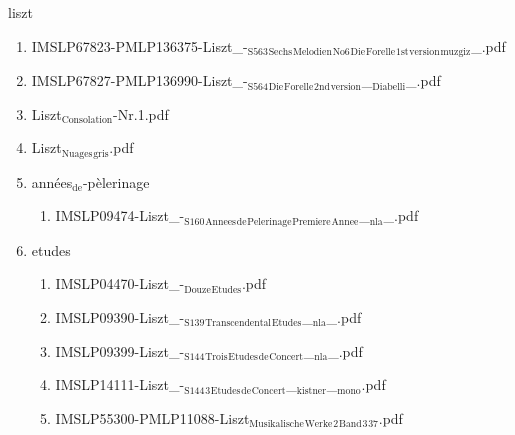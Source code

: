\documentclass[11pt]{article}
\begin{document}
\item liszt
\label{sec-1-1-1-1-44-42}
\begin{enumerate}
\item IMSLP67823-PMLP136375-Liszt\_-$_{\text{S563}}$$_{\text{Sechs}}$$_{\text{Melodien}}$$_{\text{No6}}$$_{\text{Die}}$$_{\text{Forelle}}$$_{\text{1st}}$$_{\text{version}}$$_{\text{muzgiz}}$\_.pdf
\label{sec-1-1-1-1-44-42-1}

\item IMSLP67827-PMLP136990-Liszt\_-$_{\text{S564}}$$_{\text{Die}}$$_{\text{Forelle}}$$_{\text{2nd}}$$_{\text{version}}$\_$_{\text{Diabelli}}$\_.pdf
\label{sec-1-1-1-1-44-42-2}

\item Liszt$_{\text{Consolation}}$-Nr.1.pdf
\label{sec-1-1-1-1-44-42-3}

\item Liszt$_{\text{Nuages}}$$_{\text{gris}}$.pdf
\label{sec-1-1-1-1-44-42-4}

\item années$_{\text{de}}$-pèlerinage
\label{sec-1-1-1-1-44-42-5}
\begin{enumerate}
\item IMSLP09474-Liszt\_-$_{\text{S160}}$$_{\text{Annees}}$$_{\text{de}}$$_{\text{Pelerinage}}$$_{\text{Premiere}}$$_{\text{Annee}}$\_$_{\text{nla}}$\_.pdf
\label{sec-1-1-1-1-44-42-5-1}
\end{enumerate}

\item etudes
\label{sec-1-1-1-1-44-42-6}
\begin{enumerate}
\item IMSLP04470-Liszt\_-$_{\text{Douze}}$$_{\text{Etudes}}$.pdf
\label{sec-1-1-1-1-44-42-6-1}

\item IMSLP09390-Liszt\_-$_{\text{S139}}$$_{\text{Transcendental}}$$_{\text{Etudes}}$\_$_{\text{nla}}$\_.pdf
\label{sec-1-1-1-1-44-42-6-2}

\item IMSLP09399-Liszt\_-$_{\text{S144}}$$_{\text{Trois}}$$_{\text{Etudes}}$$_{\text{de}}$$_{\text{Concert}}$\_$_{\text{nla}}$\_.pdf
\label{sec-1-1-1-1-44-42-6-3}

\item IMSLP14111-Liszt\_-$_{\text{S144}}$$_{\text{3}}$$_{\text{Etudes}}$$_{\text{de}}$$_{\text{Concert}}$\_$_{\text{kistner}}$\_$_{\text{mono}}$.pdf
\label{sec-1-1-1-1-44-42-6-4}

\item IMSLP55300-PMLP11088-Liszt$_{\text{Musikalische}}$$_{\text{Werke}}$$_{\text{2}}$$_{\text{Band}}$$_{\text{3}}$$_{\text{37}}$.pdf
\label{sec-1-1-1-1-44-42-6-5}
\end{enumerate}


\end{enumerate}
\end{document}

